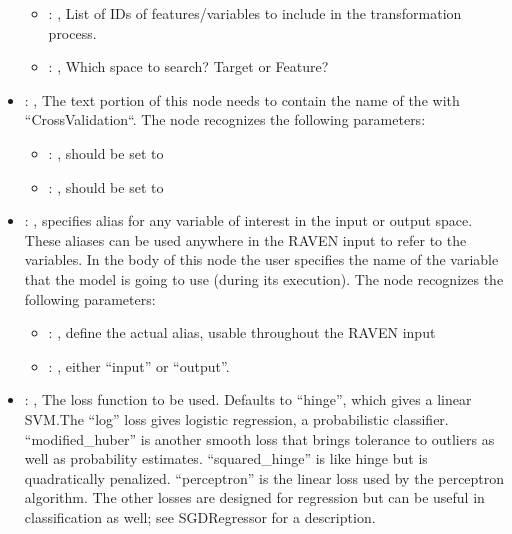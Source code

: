 \begin{itemize}
\begin{itemize}
        \item {}: , 
          List of IDs of features/variables to include in the transformation process.

        \item {}: , 
          Which space to search? Target or Feature?
      \end{itemize}

    \item {}: , 
      The text portion of this node needs to contain the name of the  with
               ``CrossValidation``.
      The  node recognizes the following parameters:
        \begin{itemize}
          \item {}: , 
            should be set to 
          \item {}: , 
            should be set to 
      \end{itemize}

    \item {}: , 
      specifies alias for         any variable of interest in the input or output space. These
      aliases can be used anywhere in the RAVEN input to         refer to the variables. In the body
      of this node the user specifies the name of the variable that the model is going to use
      (during its execution).
      The  node recognizes the following parameters:
        \begin{itemize}
          \item {}: , 
            define the actual alias, usable throughout the RAVEN input
          \item {}: , 
            either ``input'' or ``output''.
      \end{itemize}

    \item {}: , 
      The loss function to be used. Defaults to ``hinge'', which gives a linear SVM.The ``log'' loss
      gives logistic regression, a                                                  probabilistic
      classifier. ``modified\_huber'' is another smooth loss that brings tolerance to outliers as
      well as probability estimates.
      ``squared\_hinge'' is like hinge but is quadratically penalized. ``perceptron'' is the linear
      loss used by the perceptron algorithm.                                                  The
      other losses are designed for regression but can be useful in classification as well; see
      SGDRegressor for a description.


\end{itemize}
